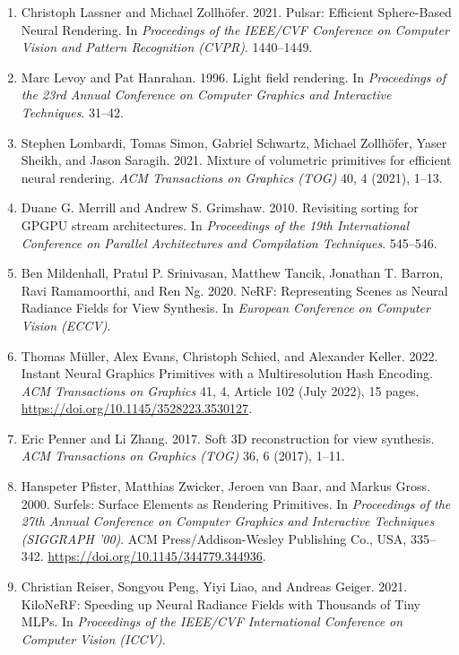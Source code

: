 \begin{enumerate}[leftmargin=2em, itemsep=0.3em, topsep=0.4em, parsep=0pt]
    \item Christoph Lassner and Michael Zollh{\"o}fer. 2021. Pulsar: Efficient Sphere-Based Neural Rendering. In \textit{Proceedings of the IEEE/CVF Conference on Computer Vision and Pattern Recognition (CVPR)}. 1440--1449.

    \item Marc Levoy and Pat Hanrahan. 1996. Light field rendering. In \textit{Proceedings of the 23rd Annual Conference on Computer Graphics and Interactive Techniques}. 31--42.

    \item Stephen Lombardi, Tomas Simon, Gabriel Schwartz, Michael Zollh{\"o}fer, Yaser Sheikh, and Jason Saragih. 2021. Mixture of volumetric primitives for efficient neural rendering. \textit{ACM Transactions on Graphics (TOG)} 40, 4 (2021), 1--13.

    \item Duane G. Merrill and Andrew S. Grimshaw. 2010. Revisiting sorting for GPGPU stream architectures. In \textit{Proceedings of the 19th International Conference on Parallel Architectures and Compilation Techniques}. 545--546.

    \item Ben Mildenhall, Pratul P. Srinivasan, Matthew Tancik, Jonathan T. Barron, Ravi Ramamoorthi, and Ren Ng. 2020. NeRF: Representing Scenes as Neural Radiance Fields for View Synthesis. In \textit{European Conference on Computer Vision (ECCV)}.

    \item Thomas M{\"u}ller, Alex Evans, Christoph Schied, and Alexander Keller. 2022. Instant Neural Graphics Primitives with a Multiresolution Hash Encoding. \textit{ACM Transactions on Graphics} 41, 4, Article 102 (July 2022), 15 pages. \url{https://doi.org/10.1145/3528223.3530127}.

    \item Eric Penner and Li Zhang. 2017. Soft 3D reconstruction for view synthesis. \textit{ACM Transactions on Graphics (TOG)} 36, 6 (2017), 1--11.

    \item Hanspeter Pfister, Matthias Zwicker, Jeroen van Baar, and Markus Gross. 2000. Surfels: Surface Elements as Rendering Primitives. In \textit{Proceedings of the 27th Annual Conference on Computer Graphics and Interactive Techniques (SIGGRAPH '00)}. ACM Press/Addison-Wesley Publishing Co., USA, 335--342. \url{https://doi.org/10.1145/344779.344936}.

    \item Christian Reiser, Songyou Peng, Yiyi Liao, and Andreas Geiger. 2021. KiloNeRF: Speeding up Neural Radiance Fields with Thousands of Tiny MLPs. In \textit{Proceedings of the IEEE/CVF International Conference on Computer Vision (ICCV)}.


\end{enumerate}
